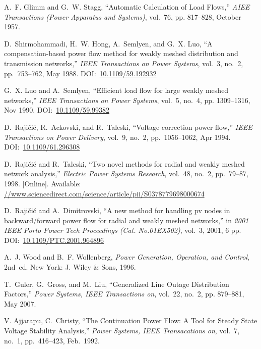 \documentclass[12pt]{article}
\numberwithin{equation}{section}
\numberwithin{table}{section}
\numberwithin{figure}{section}
\begin{document}
\begin{thebibliography}{99}
A.~F. Glimm and G.~W. Stagg, ``Automatic Calculation of Load Flows,''
  \emph{AIEE Transactions (Power Apparatus and Systems)}, vol.~76, pp.
  817--828, October 1957.

D.~Shirmohammadi, H.~W. Hong, A.~Semlyen, and G.~X. Luo, ``A compensation-based
  power flow method for weakly meshed distribution and transmission networks,''
  \emph{IEEE Transactions on Power Systems}, vol.~3, no.~2, pp.~753--762, May
  1988. DOI:~\href{https://doi.org/10.1109/59.192932}{10.1109/59.192932}

G.~X. Luo and A.~Semlyen, ``Efficient load flow for large weakly meshed
  networks,'' \emph{IEEE Transactions on Power Systems}, vol.~5, no.~4, pp.
  1309--1316, Nov 1990.
  DOI:~\href{https://doi.org/10.1109/59.99382}{10.1109/59.99382}

D.~Raji\v{c}i\'{c}, R.~Ackovski, and R.~Taleski, ``Voltage correction power flow,''
  \emph{IEEE Transactions on Power Delivery}, vol.~9, no.~2, pp.~1056--1062,
  Apr 1994. DOI:~\href{https://doi.org/10.1109/61.296308}{10.1109/61.296308}

D.~Raji\v{c}i\'{c} and R.~Taleski, ``Two novel methods for radial and weakly
  meshed network analysis,'' \emph{Electric Power Systems Research}, vol.~48,
  no.~2, pp.~79--87, 1998. [Online]. Available:
  \url{//www.sciencedirect.com/science/article/pii/S0378779698000674}

D.~Raji\v{c}i\'{c} and A.~Dimitrovski, ``A new method for handling pv nodes in
backward/forward power flow for radial and weakly meshed networks,'' in
\emph{2001 IEEE Porto Power Tech Proceedings (Cat. No.01EX502)}, vol.~3,
2001, 6 pp.\\
DOI:~\href{https://doi.org/10.1109/PTC.2001.964896}{10.1109/PTC.2001.964896}

A.~J. Wood and B.~F. Wollenberg, \emph{Power Generation, Operation, and
  Control}, 2nd~ed. New York: J. Wiley \& Sons, 1996.

T.~Guler, G.~Gross, and M.~Liu, ``Generalized Line Outage Distribution
  Factors,'' \emph{Power Systems, IEEE Transactions on}, vol.~22, no.~2, pp.
  879--881, May 2007.

V. Ajjarapu, C.~Christy, ``The Continuation Power Flow: A Tool for Steady State Voltage Stability Analysis,'' \emph{Power Systems, IEEE Transacations on}, vol.~7, no.~1, pp.~416--423, Feb.~1992.


\end{thebibliography}
\end{document}
